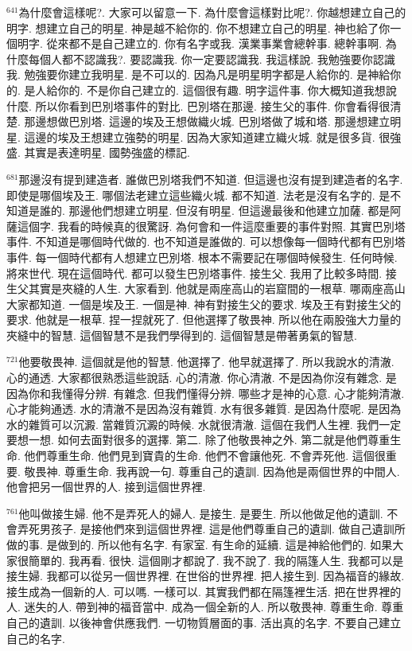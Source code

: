 \documentclass{book}
\begin{document}
$^{641}$為什麼會這樣呢?.
大家可以留意一下.
為什麼會這樣對比呢?.
你越想建立自己的明字.
想建立自己的明星.
神是越不給你的.
你不想建立自己的明星.
神也給了你一個明字.
從來都不是自己建立的.
你有名字或我.
漢業事業會總幹事.
總幹事啊.
為什麼每個人都不認識我?.
要認識我.
你一定要認識我.
我這樣說.
我勉強要你認識我.
勉強要你建立我明星.
是不可以的.
因為凡是明星明字都是人給你的.
是神給你的.
是人給你的.
不是你自己建立的.
這個很有趣.
明字這件事.
你大概知道我想說什麼.
所以你看到巴別塔事件的對比.
巴別塔在那邊.
接生父的事件.
你會看得很清楚.
那邊想做巴別塔.
這邊的埃及王想做織火城.
巴別塔做了城和塔.
那邊想建立明星.
這邊的埃及王想建立強勢的明星.
因為大家知道建立織火城.
就是很多貨.
很強盛.
其實是表達明星.
國勢強盛的標記.

$^{681}$那邊沒有提到建造者.
誰做巴別塔我們不知道.
但這邊也沒有提到建造者的名字.
即使是哪個埃及王.
哪個法老建立這些織火城.
都不知道.
法老是沒有名字的.
是不知道是誰的.
那邊他們想建立明星.
但沒有明星.
但這邊最後和他建立加薩.
都是阿薩這個字.
我看的時候真的很驚訝.
為何會和一件這麼重要的事件對照.
其實巴別塔事件.
不知道是哪個時代做的.
也不知道是誰做的.
可以想像每一個時代都有巴別塔事件.
每一個時代都有人想建立巴別塔.
根本不需要記在哪個時候發生.
任何時候.
將來世代.
現在這個時代.
都可以發生巴別塔事件.
接生父.
我用了比較多時間.
接生父其實是夾縫的人生.
大家看到.
他就是兩座高山的岩窟間的一根草.
哪兩座高山大家都知道.
一個是埃及王.
一個是神.
神有對接生父的要求.
埃及王有對接生父的要求.
他就是一根草.
捏一捏就死了.
但他選擇了敬畏神.
所以他在兩股強大力量的夾縫中的智慧.
這個智慧不是我們學得到的.
這個智慧是帶著勇氣的智慧.

$^{721}$他要敬畏神.
這個就是他的智慧.
他選擇了.
他早就選擇了.
所以我說水的清澈.
心的通透.
大家都很熟悉這些說話.
心的清澈.
你心清澈.
不是因為你沒有雜念.
是因為你和我懂得分辨.
有雜念.
但我們懂得分辨.
哪些才是神的心意.
心才能夠清澈.
心才能夠通透.
水的清澈不是因為沒有雜質.
水有很多雜質.
是因為什麼呢.
是因為水的雜質可以沉澱.
當雜質沉澱的時候.
水就很清澈.
這個在我們人生裡.
我們一定要想一想.
如何去面對很多的選擇.
第二.
除了他敬畏神之外.
第二就是他們尊重生命.
他們尊重生命.
他們見到寶貴的生命.
他們不會讓他死.
不會弄死他.
這個很重要.
敬畏神.
尊重生命.
我再說一句.
尊重自己的遺訓.
因為他是兩個世界的中間人.
他會把另一個世界的人.
接到這個世界裡.

$^{761}$他叫做接生婦.
他不是弄死人的婦人.
是接生.
是要生.
所以他做足他的遺訓.
不會弄死男孩子.
是接他們來到這個世界裡.
這是他們尊重自己的遺訓.
做自己遺訓所做的事.
是做到的.
所以他有名字.
有家室.
有生命的延續.
這是神給他們的.
如果大家很簡單的.
我再看.
很快.
這個剛才都說了.
我不說了.
我的隔篷人生.
我都可以是接生婦.
我都可以從另一個世界裡.
在世俗的世界裡.
把人接生到.
因為福音的緣故.
接生成為一個新的人.
可以嗎.
一樣可以.
其實我們都在隔篷裡生活.
把在世界裡的人.
迷失的人.
帶到神的福音當中.
成為一個全新的人.
所以敬畏神.
尊重生命.
尊重自己的遺訓.
以後神會供應我們.
一切物質層面的事.
活出真的名字.
不要自己建立自己的名字.
\end{document}
